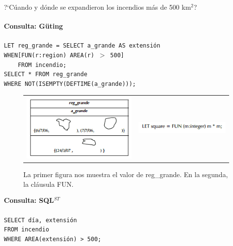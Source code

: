 \documentclass[a4paper,12pt,oneside]{report}
\begin{document}

\noindent ?`C\'uando y d\'onde se expandieron los incendios m\'as de 500 km$^{2}$?\\
\ \\
\textbf{Consulta: G\"uting}\\
\ \\
\texttt{LET reg\_grande = SELECT a\_grande AS extensi\'on\\
WHEN[FUN(r:region) AREA(r) $>$ 500]\\
\ \ \ \ FROM incendio;\\
SELECT * FROM reg\_grande\\
WHERE NOT(ISEMPTY(DEFTIME(a\_grande)));\\}

\begin{figure}[h]
\center
\begin{tabular}{c c}
\includegraphics[scale=0.6]{images/reg_grande1.png}
&
\includegraphics[scale=0.6]{images/square.png}
\end{tabular}
\caption{La primer figura nos muestra el valor de reg\_grande. En la segunda, la cl\'ausula FUN.}
\end{figure}


\noindent \textbf{Consulta: SQL$^{ST}$}\\
\ \\
\texttt{SELECT d\'ia, extensi\'on\\
FROM incendio\\
WHERE AREA(extensi\'on) > 500;\\}
\end{document}
